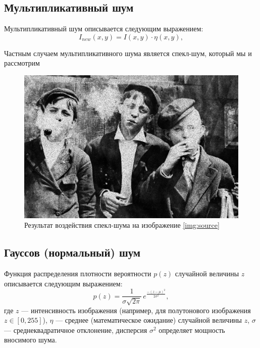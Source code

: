 \subsection{Мультипликативный шум}
Мультипликативный шум описывается следующим выражением:
\begin{equation}
    I_{new}(x,y) = I(x,y) \cdot \eta(x,y),
\end{equation}

Частным случаем мультипликативного шума является спекл-шум, который мы и рассмотрим

\begin{figure}[ht!]
    \centering
    \includegraphics[width=\textwidth]{../Noisy_images/Speckle_noise.jpg}
    \caption{Результат воздействия спекл-шума на изображение \ref{img:source}}
    \label{img:speckle_noise}
\end{figure}
\FloatBarrier

\subsection{Гауссов (нормальный) шум}
Функция распределения плотности вероятности
$p(z)$ случайной величины $z$ описывается следующим выражением:
\begin{equation}
    p(z)= \frac{1}{\sigma\sqrt{2\pi}}\, e^{\frac{-(z-\mu)^2}{2\sigma^2}},
\end{equation}
где $z$ — интенсивность изображения (например, для полутонового изображения $z \in [0,255]$), $\eta$ — среднее (математическое ожидание) случайной величины $z$, $\sigma$ — среднеквадратичное отклонение, дисперсия $\sigma^2$ определяет мощность вносимого шума.



